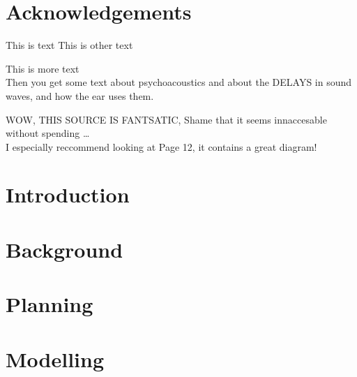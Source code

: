 \documentclass[a4paper, 12pt]{report}
\begin{document}


\abstract{}
\setcounter{page}{2}

\tableofcontents
{}

\listoffigures
{}

\listoftables
{}

\chapter*{Acknowledgements}


This is text \cite{EMHeadsets}
This is other text \cite{EMNoiseCancel}

This is more \cite{ICAAlg&Apps} text\\
Then you get some text about psychoacoustics \cite{MusCogCompSou} and about the DELAYS in sound waves, and how the ear uses them.

WOW, THIS SOURCE\cite{AdvancedDSPing} IS FANTSATIC, Shame that it seems innaccesable without spending \ldots \\
I especially reccommend looking at Page 12, it contains a great diagram!

\chapter{Introduction}


\chapter{Background}





\chapter{Planning}











\chapter{Modelling}


\end{document}
